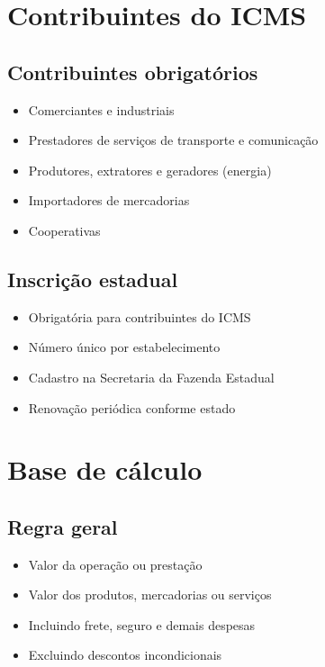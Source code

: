 \documentclass[12pt,a4paper]{article}
\begin{document}
\section{Contribuintes do ICMS}

\subsection{Contribuintes obrigatórios}
\begin{itemize}
    \item Comerciantes e industriais
    \item Prestadores de serviços de transporte e comunicação
    \item Produtores, extratores e geradores (energia)
    \item Importadores de mercadorias
    \item Cooperativas
\end{itemize}

\subsection{Inscrição estadual}
\begin{itemize}
    \item Obrigatória para contribuintes do ICMS
    \item Número único por estabelecimento
    \item Cadastro na Secretaria da Fazenda Estadual
    \item Renovação periódica conforme estado
\end{itemize}

\section{Base de cálculo}

\subsection{Regra geral}
\begin{itemize}
    \item Valor da operação ou prestação
    \item Valor dos produtos, mercadorias ou serviços
    \item Incluindo frete, seguro e demais despesas
    \item Excluindo descontos incondicionais
\end{itemize}
\end{document}
